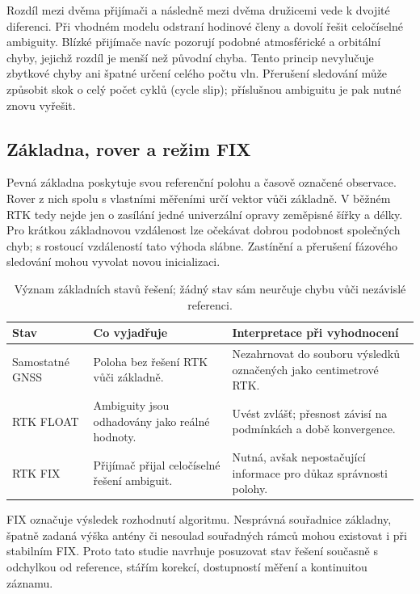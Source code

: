\documentclass[11pt,a4paper]{article}
\begin{document}
Rozdíl mezi dvěma přijímači a následně mezi dvěma družicemi vede k dvojité diferenci. Při vhodném modelu odstraní hodinové členy a dovolí řešit celočíselné ambiguity. Blízké přijímače navíc pozorují podobné atmosférické a orbitální chyby, jejichž rozdíl je menší než původní chyba. Tento princip nevylučuje zbytkové chyby ani špatné určení celého počtu vln. Přerušení sledování může způsobit skok o celý počet cyklů (cycle slip); příslušnou ambiguitu je pak nutné znovu vyřešit.\cite{esa-ambiguity}

\subsection{Základna, rover a režim FIX}
Pevná základna poskytuje svou referenční polohu a časově označené observace. Rover z nich spolu s vlastními měřeními určí vektor vůči základně. V běžném RTK tedy nejde jen o zasílání jedné univerzální opravy zeměpisné šířky a délky. Pro krátkou základnovou vzdálenost lze očekávat dobrou podobnost společných chyb; s rostoucí vzdáleností tato výhoda slábne. Zastínění a přerušení fázového sledování mohou vyvolat novou inicializaci.\cite{esa-rtk}

\par
\begin{table}[htbp]
\centering\small
\caption{Význam základních stavů řešení; žádný stav sám neurčuje chybu vůči nezávislé referenci.}
\begin{tabularx}{\linewidth}{L{27mm}YY}
\toprule
Stav & Co vyjadřuje & Interpretace při vyhodnocení\\
\midrule
Samostatné GNSS & Poloha bez řešení RTK vůči základně. & Nezahrnovat do souboru výsledků označených jako centimetrové RTK.\\
RTK FLOAT & Ambiguity jsou odhadovány jako reálné hodnoty. & Uvést zvlášť; přesnost závisí na podmínkách a době konvergence.\\
RTK FIX & Přijímač přijal celočíselné řešení ambiguit. & Nutná, avšak nepostačující informace pro důkaz správnosti polohy.\\
\bottomrule
\end{tabularx}
\end{table}
\par

FIX označuje výsledek rozhodnutí algoritmu. Nesprávná souřadnice základny, špatně zadaná výška antény či nesoulad souřadných rámců mohou existovat i při stabilním FIX. Proto tato studie navrhuje posuzovat stav řešení současně s odchylkou od reference, stářím korekcí, dostupností měření a kontinuitou záznamu.
\end{document}
